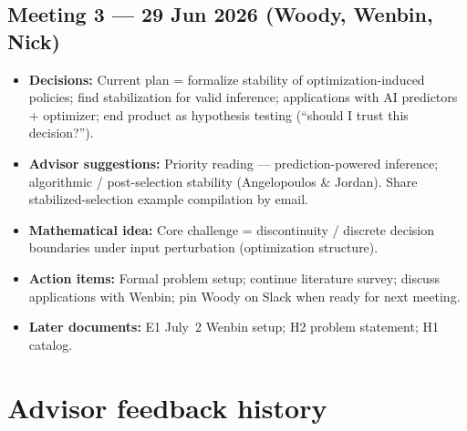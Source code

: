 \documentclass[11pt]{article}
\begin{document}
\subsection{Meeting 3 --- 29 Jun 2026 (Woody, Wenbin, Nick)}
\begin{itemize}[leftmargin=*]
  \item \textbf{Decisions:} Current plan = formalize stability of optimization-induced policies;
        find stabilization for valid inference; applications with AI predictors + optimizer;
        end product as hypothesis testing (``should I trust this decision?'').
  \item \textbf{Advisor suggestions:} Priority reading --- prediction-powered inference;
        algorithmic / post-selection stability (Angelopoulos \& Jordan). Share stabilized-selection
        example compilation by email.
  \item \textbf{Mathematical idea:} Core challenge = discontinuity / discrete decision boundaries
        under input perturbation (optimization structure).
  \item \textbf{Action items:} Formal problem setup; continue literature survey; discuss
        applications with Wenbin; pin Woody on Slack when ready for next meeting.
  \item \textbf{Later documents:} E1 July~2 Wenbin setup; H2 problem statement; H1 catalog.
\end{itemize}

\section{Advisor feedback history}
\end{document}
